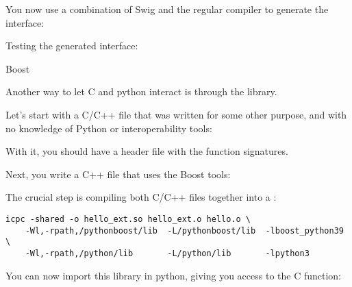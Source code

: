 You now use a combination of Swig and the regular compiler
to generate the interface:
%

Testing the generated interface:
%

 {Boost}

Another way to let C and python interact is through the  library.

Let's start with a C/C++ file that was written for some other purpose,
and with no knowledge of Python or interoperability tools:
%

%
With it, you should have a  header file with
the function signatures.

Next, you write a C++ file that uses the Boost tools:
%


The crucial step is compiling both C/C++ files together
into a :
\begin{verbatim}
icpc -shared -o hello_ext.so hello_ext.o hello.o \
    -Wl,-rpath,/pythonboost/lib  -L/pythonboost/lib  -lboost_python39 \
    -Wl,-rpath,/python/lib       -L/python/lib       -lpython3
\end{verbatim}

You can now import this library in python,
giving you access to the C function:
%





